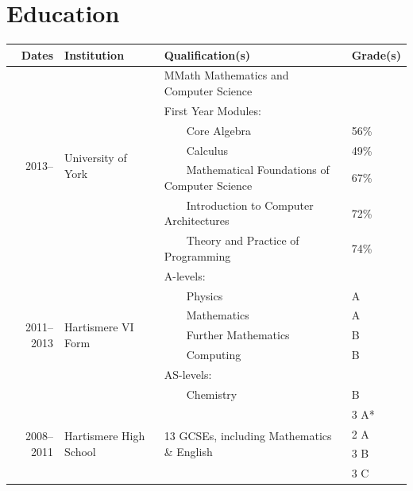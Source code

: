 \documentclass[11pt,a4paper]{article}
\begin{document}
\section*{Education}
\begin{tabular}{r | l | l | l}
  Dates                       & Institution
  & Qualification(s)                                            & Grade(s) \\ \hline
  \multirow{7}{*}{2013--}     & \multirow{7}{*}{University of York}
  & MMath Mathematics and Computer Science                      &      \\
                              &
  & First Year Modules:                                         &      \\
                              &
  & ~~~~Core Algebra                                            & 56\% \\
                              & 
  & ~~~~Calculus                                                & 49\% \\
                              & 
  & ~~~~Mathematical Foundations of Computer Science            & 67\% \\
                              & 
  & ~~~~Introduction to Computer Architectures                  & 72\% \\
                              &
  & ~~~~Theory and Practice of Programming                      & 74\% \\ \hline
  \multirow{7}{*}{2011--2013} & \multirow{7}{*}{Hartismere VI Form}
  & A-levels:                                                   &   \\
                              &
  & ~~~~Physics                                                 & A \\
                              & 
  & ~~~~Mathematics                                             & A \\
                              &
  & ~~~~Further Mathematics                                     & B \\
                              &
  & ~~~~Computing                                               & B \\
                              &
  & AS-levels:                                                  &   \\
                              &
  & ~~~~Chemistry                                               & B \\   \hline
  \multirow{4}{*}{2008--2011} & \multirow{4}{*}{Hartismere High School}
  & \multirow{4}{*}{13 GCSEs, including Mathematics \& English} & 3 A* \\
                              &
  &                                                             & 2 A  \\
                              & 
  &                                                             & 3 B  \\
                              &
  &                                                             & 3 C  \\
\end{tabular}
\end{document}
